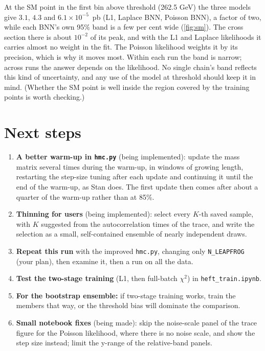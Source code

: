 \documentclass[11pt]{article}
\newcommand{\file}[1]{\nolinkurl{#1}}
\newcommand{\code}[1]{\texttt{#1}}
\begin{document}
At the SM point in the first bin above threshold (262.5 GeV) the three models give
$3.1$, $4.3$ and $6.1 \times 10^{-5}$~pb (L1, Laplace BNN, Poisson BNN), a factor of two,
while each BNN's own 95\% band is a few per cent wide (\cref{fig:sm}). The cross section
there is about $10^{-2}$ of its peak, and with the L1 and Laplace likelihoods it carries
almost no weight in the fit. The Poisson likelihood weights it by its precision, which is
why it moves most. Within each run the band is narrow; across runs the answer depends on
the likelihood. No single chain's band reflects this kind of uncertainty, and any use of the
model at threshold should keep it in mind. (Whether the SM point is well inside the region
covered by the training points is worth checking.)

\section{Next steps}
\label{sec:next}

\begin{enumerate}
  \item \textbf{A better warm-up in \file{hmc.py}} (being implemented): update the mass
    matrix several times during the warm-up, in windows of growing length, restarting the
    step-size tuning after each update and continuing it until the end of the warm-up, as
    Stan does. The first update then comes after about a quarter of the warm-up rather than
    at 85\%.
  \item \textbf{Thinning for users} (being implemented): select every $K$-th saved sample,
    with $K$ suggested from the autocorrelation times of the trace, and write the selection
    as a small, self-contained ensemble of nearly independent draws.
  \item \textbf{Repeat this run} with the improved \file{hmc.py}, changing only
    \code{N\_LEAPFROG} (your plan), then examine it, then a run on all the data.
  \item \textbf{Test the two-stage training} (L1, then full-batch $\chi^2$) in
    \file{heft_train.ipynb}.
  \item \textbf{For the bootstrap ensemble:} if two-stage training works, train the
    members that way, or the threshold bias will dominate the comparison.
  \item \textbf{Small notebook fixes} (being made): skip the noise-scale panel of the trace
    figure for the Poisson likelihood, where there is no noise scale, and show the step
    size instead; limit the y-range of the relative-band panels.
\end{enumerate}
\end{document}
